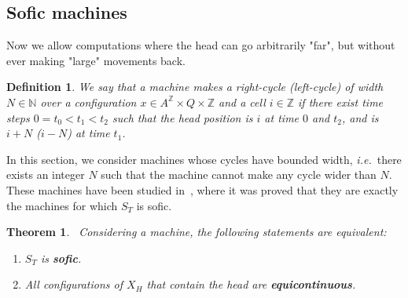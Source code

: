 \documentclass{llncs}
\newtheorem{teo}{Theorem}
\newtheorem{defi}{Definition}
\newcommand{\az}{A^\Zset}
\newcommand{\Zset}{{\mathbb Z}}
\newcommand{\Nset}{{\mathbb N}}
\newcommand{\xpr}[1]{"#1"}
\newcommand{\ie}{\textit{i.e.}\ }
\begin{document}
\subsection{Sofic machines}
Now we allow computations where the head can go arbitrarily \xpr{far}, but without ever making \xpr{large} movements back.
\begin{defi}
 We say that a machine makes a \emph{right-cycle} (\emph{left-cycle}) of width $N\in\Nset$ over a configuration $x\in\az\times Q\times\Zset$ and a cell $i\in\Zset$ if there exist time steps $0=t_0<t_1<t_2$ such that the head position is $i$ at time $0$ and $t_2$, and is $i+N$ ($i-N$) at time $t_1$.
\end{defi}
In this section, we consider machines whose cycles have bounded width, \ie there exists an integer $N$ such that the machine cannot make any cycle wider than $N$.
These machines have been studied in~\cite{GajaJAC,Gaja07}, where it was proved that they are exactly the machines for which $S_T$ is sofic.
\begin{teo}~\label{t:sofic}
Considering a machine, the following statements are equivalent:
\begin{enumerate}
 \item\label{sofic} $S_T$ is {\bf sofic}.
 \item\label{i:tmheq} All configurations of $X_H$ that contain the head are {\bf equicontinuous}.
\end{enumerate}
\end{teo}
\end{document}
